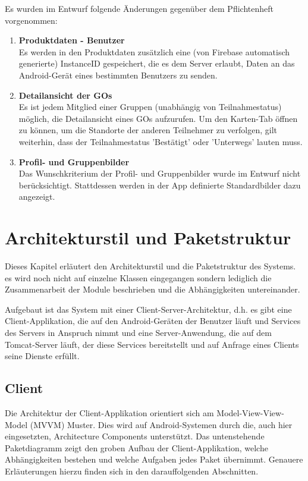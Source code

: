 \documentclass[11pt,a4paper]{article}
\begin{document}
Es wurden im Entwurf folgende Änderungen gegenüber dem Pflichtenheft vorgenommen:
\begin{enumerate}
	\item \textbf{Produktdaten - Benutzer} \\
	Es werden in den Produktdaten zusätzlich eine (von Firebase automatisch generierte) InstanceID gespeichert, die es dem Server erlaubt, Daten an das Android-Gerät eines bestimmten Benutzers zu senden.
	\item \textbf{Detailansicht der GOs} \\
	Es ist jedem Mitglied einer Gruppen (unabhängig von Teilnahmestatus) möglich, die Detailansicht eines GOs aufzurufen. Um den Karten-Tab öffnen zu können, um die Standorte der anderen Teilnehmer zu verfolgen, gilt weiterhin, dass der Teilnahmestatus 'Bestätigt' oder 'Unterwegs' lauten muss.
	\item \textbf{Profil- und Gruppenbilder} \\
	Das Wunschkriterium der Profil- und Gruppenbilder wurde im Entwurf nicht berücksichtigt. Stattdessen werden in der App definierte Standardbilder dazu angezeigt.
\end{enumerate}

\newpage

\section{Architekturstil und Paketstruktur}
Dieses Kapitel erläutert den Architekturstil und die Paketstruktur des Systems. es wird noch nicht auf einzelne Klassen eingegangen sondern lediglich die Zusammenarbeit der Module beschrieben und die Abhängigkeiten untereinander.

Aufgebaut ist das System mit einer Client-Server-Architektur, d.h. es gibt eine Client-Applikation, die auf den Android-Geräten der Benutzer läuft und Services des Servers in Anspruch nimmt und eine Server-Anwendung, die auf dem Tomcat-Server läuft, der diese Services bereitstellt und auf Anfrage eines Clients seine Dienste erfüllt.

\subsection{Client}
Die Architektur der Client-Applikation orientiert sich am Model-View-View-Model (MVVM) Muster. Dies wird auf Android-Systemen durch die, auch hier eingesetzten, Architecture Components unterstützt. Das untenstehende Paketdiagramm zeigt den groben Aufbau der Client-Applikation, welche Abhängigkeiten bestehen und welche Aufgaben jedes Paket übernimmt. Genauere Erläuterungen hierzu finden sich in den darauffolgenden Abschnitten.
\end{document}
